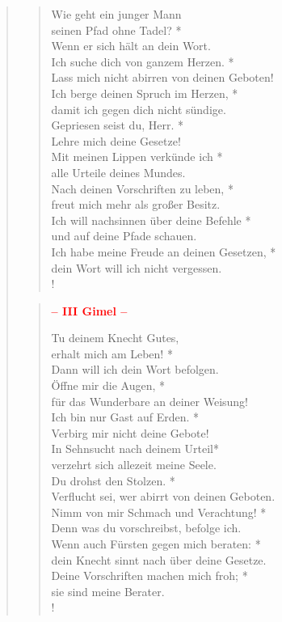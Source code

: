 \begin{quote}
\begin{verse}
Wie geht ein junger Mann\\
seinen Pfad ohne Tadel? *\\
Wenn er sich hält an dein Wort.\\
\vin Ich suche dich von ganzem Herzen. *\\
\vin Lass mich nicht abirren von deinen Geboten!\\
Ich berge deinen Spruch im Herzen, *\\
damit ich gegen dich nicht sündige.\\
\vin Gepriesen seist du, Herr. *\\
\vin Lehre mich deine Gesetze!\\
Mit meinen Lippen verkünde ich *\\
alle Urteile deines Mundes.\\
\vin Nach deinen Vorschriften zu leben, *\\
\vin freut mich mehr als großer Besitz.\\
Ich will nachsinnen über deine Befehle *\\
und auf deine Pfade schauen.\\
\vin Ich habe meine Freude an deinen Gesetzen, *\\
\vin dein Wort will ich nicht vergessen.\\!

\end{verse}

\begin{verse}

\begin{center}
 \textcolor{red}{\normalsize\bf– III Gimel – }\\
\end{center}

Tu deinem Knecht Gutes,\\
erhalt mich am Leben! *\\
Dann will ich dein Wort befolgen.\\
\vin Öffne mir die Augen, *\\
\vin für das Wunderbare an deiner Weisung!\\
Ich bin nur Gast auf Erden. *\\
Verbirg mir nicht deine Gebote!\\
\vin In Sehnsucht nach deinem Urteil*\\
\vin verzehrt sich allezeit meine Seele.\\
Du drohst den Stolzen. *\\
Verflucht sei, wer abirrt von deinen Geboten.\\
\vin Nimm von mir Schmach und Verachtung! *\\
\vin Denn was du vorschreibst, befolge ich.\\
Wenn auch Fürsten gegen mich beraten: *\\
dein Knecht sinnt nach über deine Gesetze.\\
\vin Deine Vorschriften machen mich froh; *\\
\vin sie sind meine Berater.\\!


\end{verse}
\end{quote}
